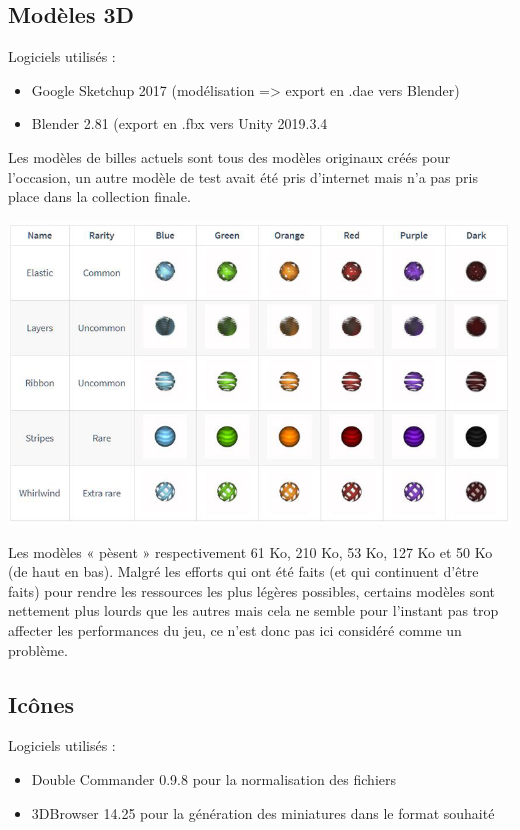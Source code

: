 \documentclass{article}
\begin{document}
\subsection{Modèles 3D}
Logiciels utilisés :
\begin{itemize}
    \item Google Sketchup 2017 (modélisation => export en .dae vers Blender)
    \item Blender 2.81 (export en .fbx vers Unity 2019.3.4
\end{itemize}

Les modèles de billes actuels sont tous des modèles originaux créés pour l’occasion, un autre modèle de test avait été pris d’internet mais n’a pas pris place dans la collection finale.

\begin{center}
    \includegraphics[width=0.8\linewidth]{report/marbles.png}\\
\end{center}

Les modèles « pèsent » respectivement 61 Ko, 210 Ko, 53 Ko, 127 Ko et 50 Ko (de haut en bas). Malgré les efforts qui ont été faits (et qui continuent d’être faits) pour rendre les 	ressources les plus légères possibles, certains modèles sont nettement plus lourds que les autres mais cela ne semble pour l’instant pas trop affecter les performances du jeu, ce n’est donc pas ici considéré comme un problème.

\subsection{Icônes}
Logiciels utilisés :
\begin{itemize}
    \item Double Commander 0.9.8 pour la normalisation des fichiers
    \item 3DBrowser 14.25 pour la génération des miniatures dans le format souhaité\\
\end{itemize}
\end{document}

